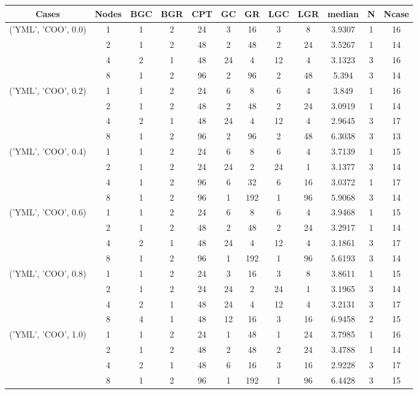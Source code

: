 \begin{tabular}{cccccccccccc}
\hline
Cases & Nodes& BGC& BGR& CPT& GC& GR& LGC& LGR& median & N & Ncase \\
\hline
\multirow{4}{*}{('YML', 'COO', 0.0)}& 1& 1& 2& 24& 3& 16& 3& 8& 3.9307& 1& 16\\
& 2& 1& 2& 48& 2& 48& 2& 24& 3.5267& 1& 14\\
& 4& 2& 1& 48& 24& 4& 12& 4& 3.1323& 3& 16\\
& 8& 1& 2& 96& 2& 96& 2& 48& 5.394& 3& 14\\
\hline
\multirow{4}{*}{('YML', 'COO', 0.2)}& 1& 1& 2& 24& 6& 8& 6& 4& 3.849& 1& 16\\
& 2& 1& 2& 48& 2& 48& 2& 24& 3.0919& 1& 14\\
& 4& 2& 1& 48& 24& 4& 12& 4& 2.9645& 3& 17\\
& 8& 1& 2& 96& 2& 96& 2& 48& 6.3038& 3& 13\\
\hline
\multirow{4}{*}{('YML', 'COO', 0.4)}& 1& 1& 2& 24& 6& 8& 6& 4& 3.7139& 1& 15\\
& 2& 1& 2& 24& 24& 2& 24& 1& 3.1377& 3& 14\\
& 4& 1& 2& 96& 6& 32& 6& 16& 3.0372& 1& 17\\
& 8& 1& 2& 96& 1& 192& 1& 96& 5.9068& 3& 14\\
\hline
\multirow{4}{*}{('YML', 'COO', 0.6)}& 1& 1& 2& 24& 6& 8& 6& 4& 3.9468& 1& 15\\
& 2& 1& 2& 48& 2& 48& 2& 24& 3.2917& 1& 14\\
& 4& 2& 1& 48& 24& 4& 12& 4& 3.1861& 3& 17\\
& 8& 1& 2& 96& 1& 192& 1& 96& 5.6193& 3& 14\\
\hline
\multirow{4}{*}{('YML', 'COO', 0.8)}& 1& 1& 2& 24& 3& 16& 3& 8& 3.8611& 1& 15\\
& 2& 1& 2& 24& 24& 2& 24& 1& 3.1965& 3& 14\\
& 4& 2& 1& 48& 24& 4& 12& 4& 3.2131& 3& 17\\
& 8& 4& 1& 48& 12& 16& 3& 16& 6.9458& 2& 15\\
\hline
\multirow{4}{*}{('YML', 'COO', 1.0)}& 1& 1& 2& 24& 1& 48& 1& 24& 3.7985& 1& 16\\
& 2& 1& 2& 48& 2& 48& 2& 24& 3.4788& 1& 14\\
& 4& 2& 1& 48& 6& 16& 3& 16& 2.9228& 3& 17\\
& 8& 1& 2& 96& 1& 192& 1& 96& 6.4428& 3& 15\\
\hline
\end{tabular}



